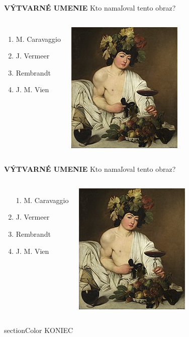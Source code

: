\documentclass[dvipsnames]{beamer}
\begin{document}
\begin{frame}
	\textbf{VÝTVARNÉ UMENIE}
	\vskip 3mm
	Kto namaľoval tento obraz?
	\begin{columns}
		\begin{enumerate}
			\item M. Caravaggio
			\item J. Vermeer
			\item Rembrandt
			\item J. M. Vien
		\end{enumerate}
		\includegraphics[scale=0.75]{pazzo}
	\end{columns}

\end{frame}

\begin{frame}
	\textbf{VÝTVARNÉ UMENIE}
	\vskip 3mm
	Kto namaľoval tento obraz?
	\begin{columns}
		\column{0.5\textwidth}
		\begin{enumerate}
			\item[\textcolor{g}{1.}] \textcolor{g}{M. Caravaggio} \setcounter{enumi}{1}
			\item J. Vermeer
			\item Rembrandt
			\item J. M. Vien
		\end{enumerate}
		\column{0.5\textwidth}
		\includegraphics[scale=0.75]{pazzo}
	\end{columns}

\end{frame}
\begin{frame}
	\begin{beamercolorbox}[sep=12pt,center]{sectionColor}%
		KONIEC\par
	\end{beamercolorbox}
\end{frame}
\end{document}
